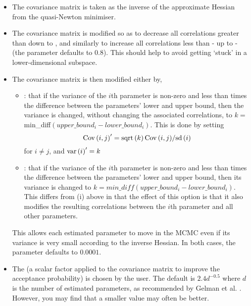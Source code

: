\begin{itemize}
\item The covariance matrix is taken as the inverse of the approximate Hessian from the quasi-Newton minimiser.
\item The covariance matrix is modified so as to decrease all correlations greater than  down to , and similarly to increase all correlations less than  - up to - (the  parameter defaults to 0.8). This should help to avoid getting `stuck' in a lower-dimensional subspace.

\item The covariance matrix is then modified either by,

\begin{itemize}
\item  {}: that if the variance of the $i$th parameter is non-zero and less than  times the difference between the parameters' lower and upper bound, then the variance is changed, without changing the associated correlations, to $k=$min\_diff$(upper\_bound_i-lower\_bound_i)$. This is done by setting \[
{\mathop{\rm Cov}\nolimits} \left( {i,j} \right)^\prime   = {{{\mathop{\rm sqrt}\nolimits} \left( k \right){\mathop{\rm Cov}\nolimits} \left( {i,j} \right)} \mathord{\left/
{\vphantom {{{\mathop{\rm sqrt}\nolimits} \left( k \right){\mathop{\rm Cov}\nolimits} \left( {i,j} \right)} {{\mathop{\rm sd}\nolimits} \left( i \right)}}} \right.
\kern-\nulldelimiterspace} {{\mathop{\rm sd}\nolimits} \left( i \right)}}
\]
for $i \ne j$, and ${\mathop{\rm var}} \left( i \right)^\prime   = k$

\item  {}: that if the variance of the $i$th parameter is non-zero and less than  times the difference between the parameters' lower and upper bound, then its variance is changed to $k=min\_diff(upper\_bound_i-lower\_bound_i)$. This differs from (i) above in that the effect of this option is that it also modifies the resulting correlations between the $i$th parameter and all other parameters.
\end{itemize}

This allows each estimated parameter to move in the MCMC even if its variance is very small according to the inverse Hessian. In both cases, the  parameter defaults to $0.0001$.

\item The  (a scalar factor applied to the covariance matrix to improve the acceptance probability) is chosen by the user. The default is $2.4d^{-0.5}$ where $d$ is the number of estimated parameters, as recommended by Gelman et al. \citep{823}. However, you may find that a smaller value may often be better.
\end{itemize}

